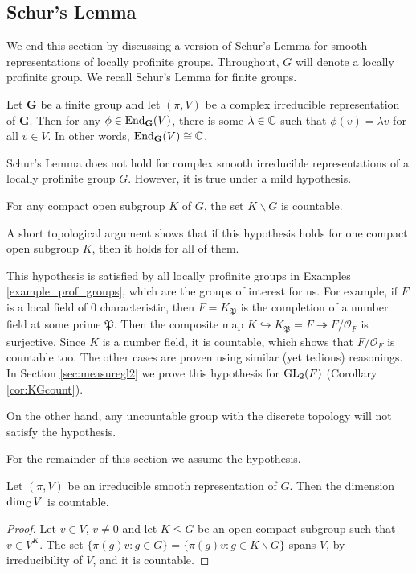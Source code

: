 \subsection{Schur's Lemma}

We end this section by discussing a version of Schur's Lemma for smooth representations of locally profinite groups. Throughout, $G$ will denote a locally profinite group. We recall Schur's Lemma for finite groups.

\begin{thm}
    Let $\mathbf{G}$ be a finite group and let $(\pi,V)$ be a complex irreducible representation of $\mathbf G$. Then for any $\phi\in\mathrm{End}_{\mathbf{G}}(V)$, there is some $\lambda\in\mathbb{C}$ such that $\phi(v)=\lambda v$ for all $v\in V$. In other words, $\mathrm{End}_{\mathbf{G}}(V)\cong\mathbb{C}$.
\end{thm}

Schur's Lemma does not hold for complex smooth irreducible representations of a locally profinite group $G$. However, it is true under a mild hypothesis.

\begin{hypothesis}
    For any compact open subgroup $K$ of $G$, the set $K\backslash G$ is countable.
\end{hypothesis}

A short topological argument shows that if this hypothesis holds for one compact open subgroup $K$, then it holds for all of them.

\begin{example}
    This hypothesis is satisfied by all locally profinite groups in Examples \ref{example_prof_groups}, which are the groups of interest for us. For example, if $F$ is a local field of $0$ characteristic, then $F=K_\mathfrak{P}$ is the completion of a number field at some prime $\mathfrak{P}$. Then the composite map $K\hookrightarrow K_\mathfrak{P}=F\twoheadrightarrow F/\mathcal{O}_F$ is surjective. Since $K$ is a number field, it is countable, which shows that $F/\mathcal{O}_F$ is countable too. The other cases are proven using similar (yet tedious) reasonings. In Section \ref{sec:measuregl2} we prove this hypothesis for $\mathrm{GL}_2(F)$ (Corollary \ref{cor:KGcount}).
    
    On the other hand, any uncountable group with the discrete topology will not satisfy the hypothesis.
\end{example}

For the remainder of this section we assume the hypothesis.

\begin{lemma}
    Let $(\pi,V)$ be an irreducible smooth representation of $G$. Then the dimension $\dim_{\mathbb{C}}V$ is countable.
\end{lemma}
\begin{proof}
    Let $v\in V$, $v\neq0$ and let $K \leq G$ be an open compact subgroup such that $v\in V^K$. The set $\{\pi(g)v:g\in G\}=\{\pi(g)v:g\in K\backslash G\}$ spans $V$, by irreducibility of $V$, and it is countable.
\end{proof}

